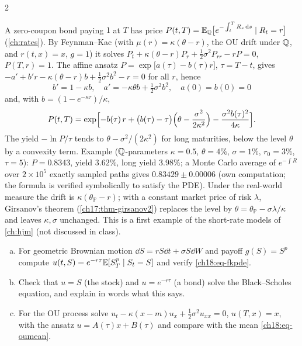 \begin{paracol}{2}
\begin{finance}\label{ch18:fin-bond}
A zero-coupon bond paying $1$ at $T$ has price $P(t,T)=\mathbb{E}_{\mathbb{Q}}\bigl[e^{-\int_t^TR_s\,\mathrm{d} s}\mid R_t=r\bigr]$ (\cref{ch:rates}). By Feynman--Kac (with $\mu(r)=\kappa(\theta-r)$, the OU drift under $\mathbb{Q}$, and $r(t,x)=x$, $g=1$) it solves $P_t+\kappa(\theta-r)P_r+\tfrac12\sigma^2P_{rr}-rP=0$, $P(T,r)=1$. The affine ansatz $P=\exp\bigl[a(\tau)-b(\tau)r\bigr]$, $\tau=T-t$, gives $-a'+b'r-\kappa(\theta-r)b+\tfrac12\sigma^2b^2-r=0$ for all $r$, hence
\[
  b'=1-\kappa b,\quad a'=-\kappa\theta b+\tfrac12\sigma^2b^2,\quad a(0)=b(0)=0
\]
and, with $b=(1-e^{-\kappa\tau})/\kappa$,
\begin{equation}\label{ch18:eq-vasbond}
  P(t,T)=\exp\Bigl[-b(\tau)\,r+\bigl(b(\tau)-\tau\bigr)\Bigl(\theta-\frac{\sigma^2}{2\kappa^2}\Bigr)-\frac{\sigma^2b(\tau)^2}{4\kappa}\Bigr].
\end{equation}
The yield $-\ln P/\tau$ tends to $\theta-\sigma^2/(2\kappa^2)$ for long maturities, below the level $\theta$ by a convexity term. Example ($\mathbb{Q}$-parameters $\kappa=0.5$, $\theta=4\%$, $\sigma=1\%$, $r_0=3\%$, $\tau=5$): $P=0.8343$, yield $3.62\%$, long yield $3.98\%$; a Monte Carlo average of $e^{-\int R}$ over $2\times10^5$ exactly sampled paths gives $0.83429\pm0.00006$ (own computation; the formula is verified symbolically to satisfy the PDE). Under the real-world measure the drift is $\kappa(\theta_{\mathbb P}-r)$; with a constant market price of risk $\lambda$, Girsanov's theorem (\cref{ch17:thm-girsanov2}) replaces the level by $\theta=\theta_{\mathbb P}-\sigma\lambda/\kappa$ and leaves $\kappa,\sigma$ unchanged. This is a first example of the short-rate models of \cref{ch:hjm} (not discussed in class).
\end{finance}

\begin{exercise}\label{ch18:ex-fk}
\leavevmode
\begin{enumerate}[(a)]
  \item For geometric Brownian motion $\dd S=rS\dd t+\sigma S\dd W$ and payoff $g(S)=S^p$ compute $u(t,S)=e^{-r\tau}\mathbb{E}[S_T^p\mid S_t=S]$ and verify \eqref{ch18:eq-fkpde}.
  \item Check that $u=S$ (the stock) and $u=e^{-r\tau}$ (a bond) solve the Black--Scholes equation, and explain in words what this says.
  \item For the OU process solve $u_t-\kappa(x-m)u_x+\tfrac12\sigma^2u_{xx}=0$, $u(T,x)=x$, with the ansatz $u=A(\tau)x+B(\tau)$ and compare with the mean \eqref{ch18:eq-oumean}.
\end{enumerate}
\end{exercise}


\end{paracol}
